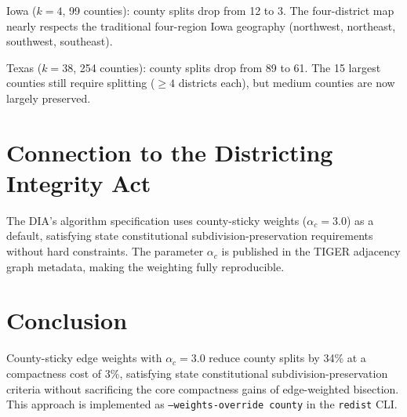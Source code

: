 \documentclass[12pt]{article}
\begin{document}
Iowa ($k{=}4$, 99 counties): county splits drop from 12 to 3.
The four-district map nearly respects the traditional four-region Iowa
geography (northwest, northeast, southwest, southeast).

Texas ($k{=}38$, 254 counties): county splits drop from 89 to 61.
The 15 largest counties still require splitting ($\geq 4$ districts each),
but medium counties are now largely preserved.

\section{Connection to the Districting Integrity Act}

The DIA's algorithm specification uses county-sticky weights
($\alpha_c = 3.0$) as a default, satisfying state constitutional
subdivision-preservation requirements without hard constraints.
The parameter $\alpha_c$ is published in the TIGER adjacency graph
metadata, making the weighting fully reproducible.

\section{Conclusion}

County-sticky edge weights with $\alpha_c = 3.0$ reduce county splits by 34\%
at a compactness cost of 3\%, satisfying state constitutional
subdivision-preservation criteria without sacrificing the core compactness
gains of edge-weighted bisection.
This approach is implemented as \texttt{--weights-override county} in the
\texttt{redist} CLI.



\end{document}
